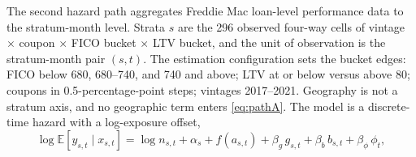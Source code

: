 \documentclass[12pt]{article}
\begin{document}
The second hazard path aggregates Freddie Mac loan-level performance data to the stratum-month level. Strata $s$ are the 296 observed four-way cells of vintage $\times$ coupon $\times$ FICO bucket $\times$ LTV bucket, and the unit of observation is the stratum-month pair $(s,t)$. The estimation configuration sets the bucket edges: FICO below 680, 680--740, and 740 and above; LTV at or below versus above 80; coupons in 0.5-percentage-point steps; vintages 2017--2021. Geography is not a stratum axis, and no geographic term enters \eqref{eq:pathA}. The model is a discrete-time hazard with a log-exposure offset,
\begin{equation}\label{eq:pathA}
\log \mathbb{E}\!\left[y_{s,t} \mid x_{s,t}\right] = \log n_{s,t} + \alpha_{s} + f\!\left(a_{s,t}\right) + \beta_g\, g_{s,t} + \beta_b\, b_{s,t} + \beta_\phi\, \phi_t ,
\end{equation}
\end{document}
